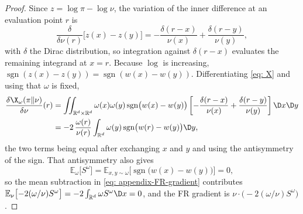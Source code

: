 \documentclass{article}
\begin{document}
\begin{proof}
Since $z = \log\pi-\log\nu$, the variation of the inner difference at an evaluation point $r$ is
\begin{equation*}
    \frac{\delta}{\delta\nu(r)}\bigl[z(x)-z(y)\bigr]
    = -\frac{\delta(r-x)}{\nu(x)} + \frac{\delta(r-y)}{\nu(y)},
\end{equation*}
with $\delta$ the Dirac distribution, so integration against $\delta(r-x)$ evaluates the remaining integrand at $x=r$. Because $\log$ is increasing, $\operatorname{sgn}(z(x)-z(y)) = \operatorname{sgn}(w(x)-w(y))$. Differentiating \eqref{eq: X} and using that $\omega$ is fixed,
\begin{align*}
    \frac{\delta \X_\omega(\pi\|\nu)}{\delta\nu}(r)
    &= \iint_{\mathbb R^d\times\mathbb R^d} \omega(x)\omega(y)\operatorname{sgn}\bigl(w(x)-w(y)\bigr)
       \left[-\frac{\delta(r-x)}{\nu(x)} + \frac{\delta(r-y)}{\nu(y)}\right] \D x \D y \\
    &= -2\,\frac{\omega(r)}{\nu(r)}\int_{\mathbb R^d} \omega(y)\operatorname{sgn}\bigl(w(r)-w(y)\bigr)\D y ,
\end{align*}
the two terms being equal after exchanging $x$ and $y$ and using the antisymmetry of the sign. That antisymmetry also gives
\begin{equation}
    \mathbb E_{\omega}\bigl[S^{\omega}\bigr] = \mathbb E_{x,y\sim\omega}\bigl[\operatorname{sgn}\bigl(w(x)-w(y)\bigr)\bigr] = 0 ,
    \label{eq: appendix-S-mean-zero}
\end{equation}
so the mean subtraction in \eqref{eq: appendix-FR-gradient} contributes $\mathbb E_\nu\bigl[-2(\omega/\nu)S^{\omega}\bigr] = -2\int_{\mathbb R^d}\omega S^{\omega}\D x = 0$, and the FR gradient is $\nu\cdot\bigl(-2(\omega/\nu)S^{\omega}\bigr)$.
\end{proof}
\end{document}
